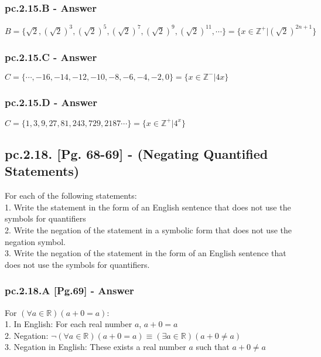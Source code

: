 \subsubsection*{pc.2.15.B - Answer}
$B = \{\sqrt{2},(\sqrt{2})^3, (\sqrt{2})^5, (\sqrt{2})^7, (\sqrt{2})^9, (\sqrt{2})^11, \cdots  \} = \{ x \in \mathbb{Z^+}|  (\sqrt{2})^{2n + 1} \}$ 

\subsubsection*{pc.2.15.C - Answer}
$C = \{\cdots, -16, -14, -12, -10, -8, -6, -4, -2, 0 \} = \{ x \in \mathbb{Z^-}| 4x \}$ 

\subsubsection*{pc.2.15.D - Answer}
$C = \{1, 3, 9, 27, 81, 243, 729, 2187  \cdots \} = \{ x \in \mathbb{Z^+}| 4^x \}$ 







\newpage
\subsection{pc.2.18. [Pg. 68-69] - (Negating Quantified Statements)}
For each of the following statements: \\
1. Write the statement in the form of an English sentence that does not use the symbols for quantifiers \\
2. Write the negation of the statement in a symbolic form that does not use the negation symbol. \\
3. Write the negation of the statement in the form of an English sentence that does not use the symbols for quantifiers. \\

\subsubsection*{pc.2.18.A [Pg.69] - Answer}
For $(\forall a \in \mathbb{R})(a+0=a)$: \\
1. In English: For each real number $a$, $a + 0 = a$ \\
2. Negation: $\neg (\forall a \in \mathbb{R})(a+0=a) \equiv (\exists a \in \mathbb{R})(a+0 \neq a)$ \\
3. Negation in English: These exists a real number $a$ such that $a+0 \neq a$ \\

